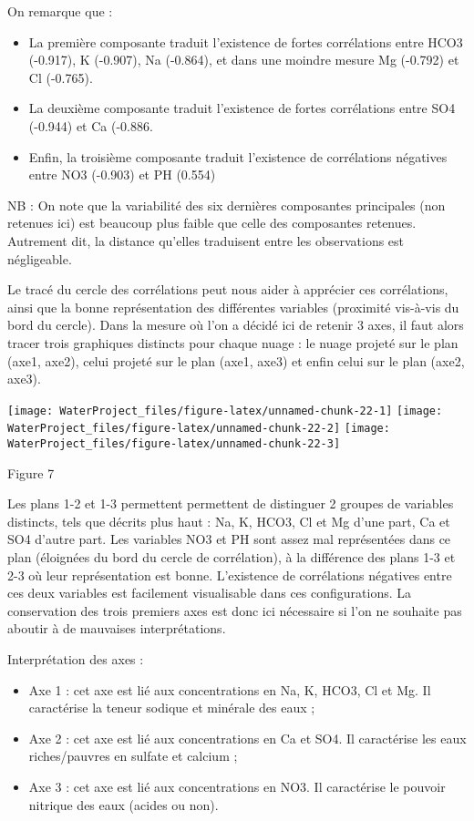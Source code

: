 \documentclass[]{article}
\providecommand{\tightlist}{%
  \setlength{\itemsep}{0pt}\setlength{\parskip}{0pt}}
\begin{document}
On remarque que :

\begin{itemize}
\tightlist
\item
  La première composante traduit l'existence de fortes corrélations
  entre HCO3 (-0.917), K (-0.907), Na (-0.864), et dans une moindre
  mesure Mg (-0.792) et Cl (-0.765).
\item
  La deuxième composante traduit l'existence de fortes corrélations
  entre SO4 (-0.944) et Ca (-0.886.
\item
  Enfin, la troisième composante traduit l'existence de corrélations
  négatives entre NO3 (-0.903) et PH (0.554)
\end{itemize}

NB : On note que la variabilité des six dernières composantes
principales (non retenues ici) est beaucoup plus faible que celle des
composantes retenues. Autrement dit, la distance qu'elles traduisent
entre les observations est négligeable.

Le tracé du cercle des corrélations peut nous aider à apprécier ces
corrélations, ainsi que la bonne représentation des différentes
variables (proximité vis-à-vis du bord du cercle). Dans la mesure où
l'on a décidé ici de retenir 3 axes, il faut alors tracer trois
graphiques distincts pour chaque nuage : le nuage projeté sur le plan
(axe1, axe2), celui projeté sur le plan (axe1, axe3) et enfin celui sur
le plan (axe2, axe3).

\texttt{[image: WaterProject\_files/figure-latex/unnamed-chunk-22-1]}
\texttt{[image: WaterProject\_files/figure-latex/unnamed-chunk-22-2]}
\texttt{[image: WaterProject\_files/figure-latex/unnamed-chunk-22-3]}

Figure 7

Les plans 1-2 et 1-3 permettent permettent de distinguer 2 groupes de
variables distincts, tels que décrits plus haut : Na, K, HCO3, Cl et Mg
d'une part, Ca et SO4 d'autre part. Les variables NO3 et PH sont assez
mal représentées dans ce plan (éloignées du bord du cercle de
corrélation), à la différence des plans 1-3 et 2-3 où leur
représentation est bonne. L'existence de corrélations négatives entre
ces deux variables est facilement visualisable dans ces configurations.
La conservation des trois premiers axes est donc ici nécessaire si l'on
ne souhaite pas aboutir à de mauvaises interprétations.

Interprétation des axes :

\begin{itemize}
\tightlist
\item
  Axe 1 : cet axe est lié aux concentrations en Na, K, HCO3, Cl et Mg.
  Il caractérise la teneur sodique et minérale des eaux ;
\item
  Axe 2 : cet axe est lié aux concentrations en Ca et SO4. Il
  caractérise les eaux riches/pauvres en sulfate et calcium ;
\item
  Axe 3 : cet axe est lié aux concentrations en NO3. Il caractérise le
  pouvoir nitrique des eaux (acides ou non).
\end{itemize}
\end{document}
